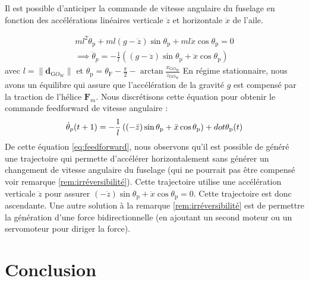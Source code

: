 {    Il est possible d'anticiper la commande de vitesse angulaire du fuselage en fonction des accélérations linéaires verticale $\ddot{z}$ et horizontale $\ddot{x}$ de l'aile.

    \begin{align}
        \label{eq:dynamiquependule}
        m l^{2} \ddot{\theta}_{\text{p}} + ml(g-\ddot{z}) \sin{\theta_{\text{p}}} + ml \ddot{x} \cos{\theta_{\text{p}}} = 0\\
        \implies \ddot{\theta}_{p} = -\frac{1}{l} \left( (g-\ddot{z})\sin{\theta_{\text{p}}} + \ddot{x} \cos{\theta_{\text{p}}} \right)
    \end{align}
    avec $l = \| \boldsymbol{d}_{\text{G}O_{\text{W}}} \|$ et $\theta_{\text{p}} = \theta_{\text{F}} - \frac{\pi}{2} - \arctan{\frac{{x}_{\text{G}O_{\text{W}}}}{{z}_{\text{G}O_{\text{W}}}}}$
    En régime stationnaire, nous avons un équilibre qui assure que l'accélération de la gravité $g$ est compensé par la traction de l'hélice $\boldsymbol{F}_{m}$. Nous discrétisons cette équation pour obtenir le commande feedforward de vitesse angulaire : 
    \begin{align}
        \label{eq:feedforward}
        \dot{\theta}_{p} (t+1) = -\frac{1}{l} \left( (-\ddot{z})\sin{\theta_{\text{\text{p}}}} + \ddot{x} \cos{\theta_{\text{p}}} \right) + dot{\theta}_{\text{p}} (t)
    \end{align}
    De cette équation \eqref{eq:feedforward}, nous observons qu'il est possible de généré une trajectoire qui permette d'accélérer horizontalement sans générer un changement de vitesse angulaire du fuselage (qui ne pourrait pas être compensé voir remarque \ref{rem:irréversibilité}). Cette trajectoire utilise une accélération verticale $\ddot{z}$ pour assurer $ (-\ddot{z})\sin{\theta_{\text{p}}} + \ddot{x} \cos{\theta_{\text{p}}} = 0 $. Cette trajectoire est donc ascendante. Une autre solution à la remarque \ref{rem:irréversibilité} est de permettre la génération d'une force bidirectionnelle (en ajoutant un second moteur ou un servomoteur pour diriger la force).



}




\section{Conclusion}

